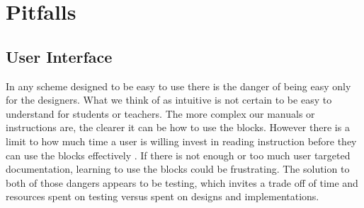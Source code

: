   \section{Pitfalls}
  \subsection{User Interface}
  In any scheme designed to be easy to use there is the danger of being easy only for the designers. What we think of as intuitive is not certain to be easy to understand for students or teachers. 
  The more complex our manuals or instructions are, the clearer it can be how to use the blocks. However there is a limit to how much time a  user is willing invest in reading instruction before they can use the blocks effectively . If there is not enough or too much user targeted documentation, learning to use the blocks could be frustrating.
  The solution to both of those dangers appears to be testing, which invites a trade off of time and resources spent on testing versus spent on designs and implementations. 

